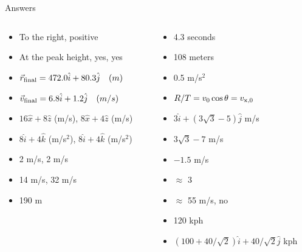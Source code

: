 \documentclass{beamer}
\begin{document}
\begin{frame}{Answers}
\begin{columns}[T]
\begin{column}{0.5\textwidth}
\begin{itemize}
\item To the right, positive
\item At the peak height, yes, yes
\item $\vec{r}_{\rm final} = 472.0 \hat{i} + 80.3\hat{j}\quad (m)$
\item $\vec{v}_{\rm final} = 6.8 \hat{i} + 1.2\hat{j}\quad (m/s)$
\item $16 \hat{x} + 8\hat{z}$ (m/s), $8\hat{x} + 4\hat{z}$ (m/s)
\item $8\hat{i} + 4\hat{k}$ (m/s$^2$), $8\hat{i} + 4\hat{k}$ (m/s$^2$)
\item 2 m/s, 2 m/s
\item 14 m/s, 32 m/s
\item 190 m
\end{itemize}
\end{column}
\begin{column}{0.5\textwidth}
\begin{itemize}
\item 4.3 seconds
\item 108 meters
\item 0.5 m/s$^2$
\item $R/T = v_{\rm 0} \cos\theta = v_{\rm x,0}$
\item $3\hat{i} + (3\sqrt{3}-5)\hat{j}$  m/s
\item $3\sqrt{3}-7$ m/s
\item $-1.5$ m/s
\item $\approx$ 3
\item $\approx$ 55 m/s, no
\item 120 kph
\item $(100+40/\sqrt{2})\hat{i} + 40/\sqrt{2}\hat{j}$  kph
\end{itemize}
\end{column}
\end{columns}
\end{frame}
\end{document}
